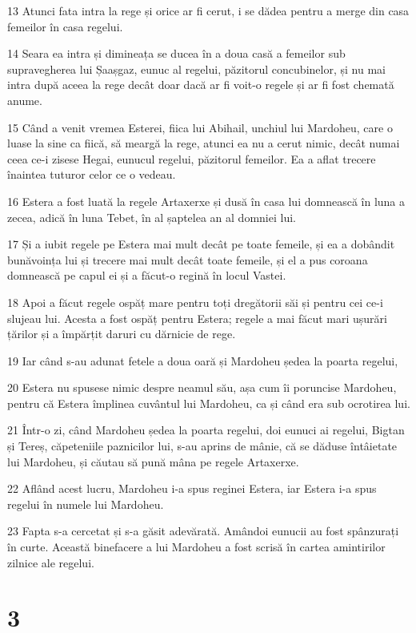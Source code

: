 \par 13 Atunci fata intra la rege și orice ar fi cerut, i se dădea pentru a merge din casa femeilor în casa regelui.
\par 14 Seara ea intra și dimineața se ducea în a doua casă a femeilor sub supravegherea lui Șaașgaz, eunuc al regelui, păzitorul concubinelor, și nu mai intra după aceea la rege decât doar dacă ar fi voit-o regele și ar fi fost chemată anume.
\par 15 Când a venit vremea Esterei, fiica lui Abihail, unchiul lui Mardoheu, care o luase la sine ca fiică, să meargă la rege, atunci ea nu a cerut nimic, decât numai ceea ce-i zisese Hegai, eunucul regelui, păzitorul femeilor. Ea a aflat trecere înaintea tuturor celor ce o vedeau.
\par 16 Estera a fost luată la regele Artaxerxe și dusă în casa lui domnească în luna a zecea, adică în luna Tebet, în al șaptelea an al domniei lui.
\par 17 Și a iubit regele pe Estera mai mult decât pe toate femeile, și ea a dobândit bunăvoința lui și trecere mai mult decât toate femeile, și el a pus coroana domnească pe capul ei și a făcut-o regină în locul Vastei.
\par 18 Apoi a făcut regele ospăț mare pentru toți dregătorii săi și pentru cei ce-i slujeau lui. Acesta a fost ospăț pentru Estera; regele a mai făcut mari ușurări țărilor și a împărțit daruri cu dărnicie de rege.
\par 19 Iar când s-au adunat fetele a doua oară și Mardoheu ședea la poarta regelui,
\par 20 Estera nu spusese nimic despre neamul său, așa cum îi poruncise Mardoheu, pentru că Estera împlinea cuvântul lui Mardoheu, ca și când era sub ocrotirea lui.
\par 21 Într-o zi, când Mardoheu ședea la poarta regelui, doi eunuci ai regelui, Bigtan și Tereș, căpeteniile paznicilor lui, s-au aprins de mânie, că se dăduse întâietate lui Mardoheu, și căutau să pună mâna pe regele Artaxerxe.
\par 22 Aflând acest lucru, Mardoheu i-a spus reginei Estera, iar Estera i-a spus regelui în numele lui Mardoheu.
\par 23 Fapta s-a cercetat și s-a găsit adevărată. Amândoi eunucii au fost spânzurați în curte. Această binefacere a lui Mardoheu a fost scrisă în cartea amintirilor zilnice ale regelui.

\chapter{3}

